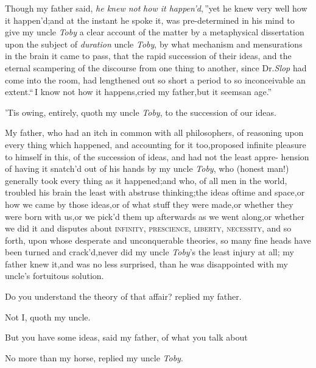 \documentclass{article}
\begin{document}
Though my father said, \lqq\textit{he knew not}\break
\lqq\textit{how it happen’d},\,”\tsk yet he knew very well how it happen’d;\tsh and
at the instant he spoke it, was pre-determined in his mind to
give my uncle \textit{Toby} a clear account of the matter by a
metaphysical dissertation upon the subject of
\textit{duration}
uncle \textit{Toby},
by what mechanism and mensurations in the brain it came to pass,
that the rapid succession of their ideas, and the eternal
scampering of the discourse from one thing to another, since
Dr.\@ \textit{Slop} had come into the room, had lengthened out
so short a period to so inconceivable an extent.\tsk “\,I know not
how it happens,\break\tsk cried my father,\tsk\lqq but it
seems\break\lqq an age.”

\tsk ’Tis owing, entirely, quoth my uncle
\textit{Toby}, to the succession of our ideas.

My father, who had an itch in common with all philosophers, of
reasoning upon every thing which happened, and accounting for it
too,\tsk proposed infinite pleasure to himself in this, of the
succession of ideas, and had not the least appre- hension of having
it snatch’d out of his hands by my uncle \textit{Toby}, who (honest man!)
generally took every thing as it happened;\tsh and who, of
all men in the world, troubled his brain the least with abstruse
thinking;\tsk the ideas of\break time and space,\tsk or how we came by
those ideas,\tsk or of what stuff they were made,\tsk or
whether they were born with us,\tsk or we pick’d them up
afterwards as we went along,\tsk or whether we did it
and disputes about
\textsc{infinity}, \textsc{prescience}, \textsc{liberty},
\textsc{necessity}, and so forth, upon whose desperate and
unconquerable theo\-ries, so many fine heads have been turned and
crack’d,\tsh never did my uncle \textit{Toby}’s the least injury
at all; my father knew it,\tsk and was no less surprised, than
he was disappointed with my uncle’s fortuitous solution.

Do you understand the theory of that affair? replied my
father.

Not I, quoth my uncle.

\tsh But you have some ideas, said my father, of what you talk
about\tsh

No more than my horse, replied my uncle \textit{Toby}.
\end{document}
